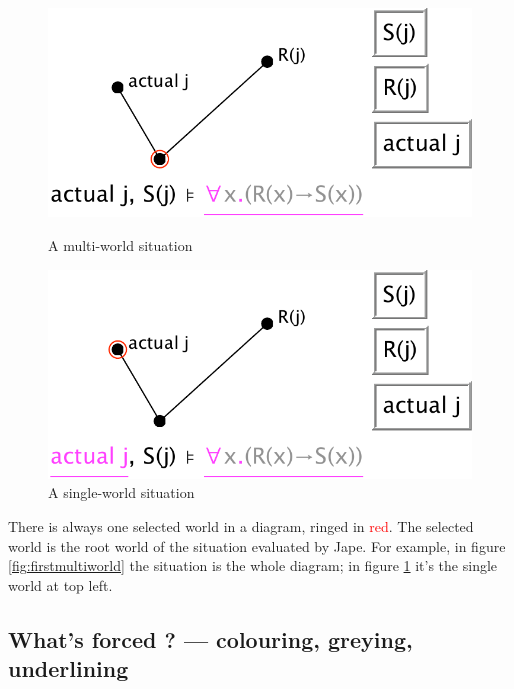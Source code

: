 \documentclass[11pt]{book}
\newcommand{\figref}[1]{figure \ref{fig:#1}}
\begin{document}
\begin{figure}
\centering
\parbox{200pt}{\centering
\includegraphics[scale=0.5]{pics/firstmultiworld}
\caption{A multi-world situation}
\label{fig:firstmultiworld}
}
\qquad
\parbox{200pt}{\centering
\includegraphics[scale=0.5]{pics/parvainmultum}
\caption{A single-world situation}
\label{fig:parvainmultum}
}
\end{figure}

There is always one selected world in a diagram, ringed in \textcolor{red}{red}. The selected world is the root world of the situation evaluated by Jape. For example, in \figref{firstmultiworld} the situation is the whole diagram; in \figref{parvainmultum} it's the single world at top left.

\subsection{What's forced ? --- colouring, greying, underlining}
\end{document}
